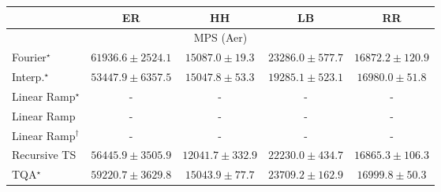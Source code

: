 \begin{tabular}{l|cccc|}
\toprule
            & ER & HH & LB & RR \\
\midrule
\multicolumn{5}{c}{\rule{0pt}{8pt}MPS (Aer)} \\
\midrule
Fourier$^\star$ & {\cellcolor[HTML]{6A0867}} \color[HTML]{F1F1F1} $61936.6\pm 2524.1$ & {\cellcolor[HTML]{E7F1F7}} \color[HTML]{000000} $15087.0\pm 19.3$ & {\cellcolor[HTML]{C3D6E8}} \color[HTML]{000000} $23286.0\pm 577.7$ & {\cellcolor[HTML]{E1EDF5}} \color[HTML]{000000} $16872.2\pm 120.9$ \\
Interp.$^\star$ & {\cellcolor[HTML]{873696}} \color[HTML]{F1F1F1} $53447.9\pm 6357.5$ & {\cellcolor[HTML]{E7F1F7}} \color[HTML]{000000} $15047.8\pm 53.3$ & {\cellcolor[HTML]{D7E5F0}} \color[HTML]{000000} $19285.1\pm 523.1$ & {\cellcolor[HTML]{E1ECF4}} \color[HTML]{000000} $16980.0\pm 51.8$ \\
Linear Ramp$^\star$ & {\cellcolor[HTML]{000000}} \color[HTML]{F1F1F1} {\cellcolor{white}} \color{black} - & {\cellcolor[HTML]{000000}} \color[HTML]{F1F1F1} {\cellcolor{white}} \color{black} - & {\cellcolor[HTML]{000000}} \color[HTML]{F1F1F1} {\cellcolor{white}} \color{black} - & {\cellcolor[HTML]{000000}} \color[HTML]{F1F1F1} {\cellcolor{white}} \color{black} - \\
Linear Ramp & {\cellcolor[HTML]{000000}} \color[HTML]{F1F1F1} {\cellcolor{white}} \color{black} - & {\cellcolor[HTML]{000000}} \color[HTML]{F1F1F1} {\cellcolor{white}} \color{black} - & {\cellcolor[HTML]{000000}} \color[HTML]{F1F1F1} {\cellcolor{white}} \color{black} - & {\cellcolor[HTML]{000000}} \color[HTML]{F1F1F1} {\cellcolor{white}} \color{black} - \\
Linear Ramp$^\dagger$ & {\cellcolor[HTML]{000000}} \color[HTML]{F1F1F1} {\cellcolor{white}} \color{black} - & {\cellcolor[HTML]{000000}} \color[HTML]{F1F1F1} {\cellcolor{white}} \color{black} - & {\cellcolor[HTML]{000000}} \color[HTML]{F1F1F1} {\cellcolor{white}} \color{black} - & {\cellcolor[HTML]{000000}} \color[HTML]{F1F1F1} {\cellcolor{white}} \color{black} - \\
Recursive TS & {\cellcolor[HTML]{832088}} \color[HTML]{F1F1F1} $56445.9\pm 3505.9$ & {\cellcolor[HTML]{F1F8FB}} \color[HTML]{000000} $12041.7\pm 332.9$ & {\cellcolor[HTML]{C8DAEA}} \color[HTML]{000000} $22230.0\pm 434.7$ & {\cellcolor[HTML]{E1EDF5}} \color[HTML]{000000} $16865.3\pm 106.3$ \\
TQA$^\star$ & {\cellcolor[HTML]{800F7B}} \color[HTML]{F1F1F1} $59220.7\pm 3629.8$ & {\cellcolor[HTML]{E7F1F7}} \color[HTML]{000000} $15043.9\pm 77.7$ & {\cellcolor[HTML]{C1D4E7}} \color[HTML]{000000} $23709.2\pm 162.9$ & {\cellcolor[HTML]{E1ECF4}} \color[HTML]{000000} $16999.8\pm 50.3$ \\

\end{tabular}
